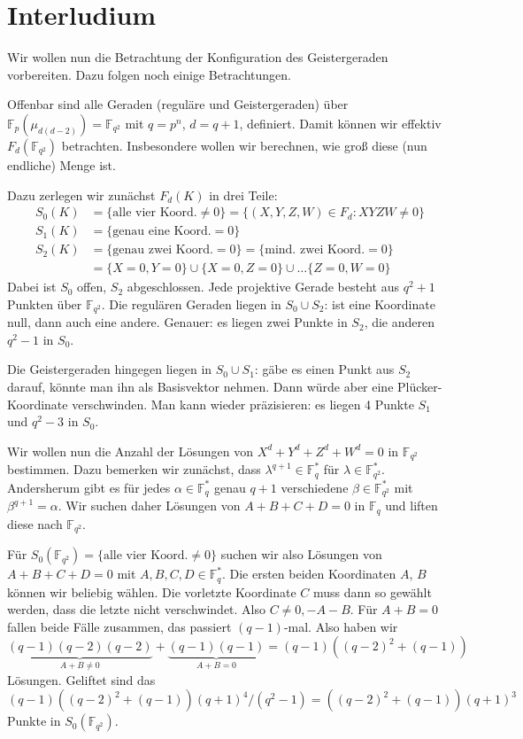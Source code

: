 \section{Interludium}
Wir wollen nun die Betrachtung der Konfiguration des Geistergeraden vorbereiten. Dazu folgen noch einige Betrachtungen.

Offenbar sind alle Geraden (reguläre und Geistergeraden) über $\mathbb F_p(\mu_{d(d-2)}) = \mathbb F_{q^2}$ mit $q = p^n$, $d = q+1$, definiert. Damit können wir effektiv $F_d(\mathbb F_{q^2})$ betrachten. Insbesondere wollen wir berechnen, wie groß diese (nun endliche) Menge ist.

Dazu zerlegen wir zunächst $F_d(K)$ in drei Teile:
\begin{align*}
S_0(K) &= \{\text{alle vier Koord.}\neq 0\} = \{(X,Y,Z,W) \in F_d : XYZW \neq 0\} \\
S_1(K) &= \{\text{genau eine Koord.}= 0\} \\
S_2(K) &= \{\text{genau zwei Koord.}= 0\} = \{\text{mind. zwei Koord.}= 0\} \\
	&= \{X = 0, Y = 0\} \cup \{X = 0, Z = 0\} \cup \dots \{Z = 0, W = 0\}
\end{align*}
Dabei ist $S_0$ offen, $S_2$ abgeschlossen. Jede projektive Gerade besteht aus $q^2+1$ Punkten über $\mathbb F_{q^2}$. Die regulären Geraden liegen in $S_0 \cup S_2$: ist eine Koordinate null, dann auch eine andere. Genauer: es liegen zwei Punkte in $S_2$, die anderen $q^2-1$ in $S_0$.

Die Geistergeraden hingegen liegen in $S_0 \cup S_1$: gäbe es einen Punkt aus $S_2$ darauf, könnte man ihn als Basisvektor nehmen. Dann würde aber eine Plücker-Koordinate verschwinden. Man kann wieder präzisieren: es liegen 4 Punkte $S_1$ und $q^2-3$ in $S_0$.

Wir wollen nun die Anzahl der Lösungen von $X^d+Y^d+Z^d+W^d=0$ in $\mathbb F_{q^2}$ bestimmen. Dazu bemerken wir zunächst, dass $\lambda^{q+1} \in \mathbb F_q^*$ für $\lambda \in \mathbb F_{q^2}^*$. Andersherum gibt es für jedes $\alpha \in \mathbb F_q^*$ genau $q+1$ verschiedene $\beta \in \mathbb F_{q^2}^*$ mit $\beta^{q+1} = \alpha$. Wir suchen daher Lösungen von $A+B+C+D=0$ in $\mathbb F_q$ und liften diese nach $\mathbb F_{q^2}$.

Für $S_0(\mathbb F_{q^2}) = \{\text{alle vier Koord.}\neq 0\}$ suchen wir also Lösungen von $A+B+C+D=0$ mit $A,B,C,D \in \mathbb F_q^*$. Die ersten beiden Koordinaten $A$, $B$ können wir beliebig wählen. Die vorletzte Koordinate $C$ muss dann so gewählt werden, dass die letzte nicht verschwindet. Also $C \neq 0, -A-B$. Für $A+B=0$ fallen beide Fälle zusammen, das passiert $(q-1)$-mal. Also haben wir
\begin{equation*}
\underbrace{(q-1)(q-2)(q-2)}_{A+B \neq 0} + \underbrace{(q-1)(q-1)}_{A+B=0} = (q-1)((q-2)^2+(q-1))
\end{equation*}
Lösungen. Geliftet sind das
\begin{equation}
(q-1)((q-2)^2+(q-1))(q+1)^4/(q^2-1) = ((q-2)^2+(q-1))(q+1)^3
\end{equation}
Punkte in $S_0(\mathbb F_{q^2})$.

